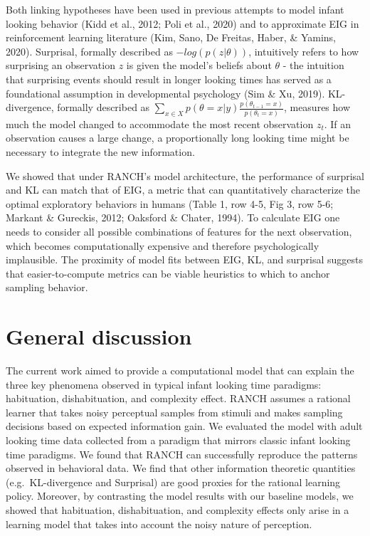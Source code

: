 \documentclass[10pt, letterpaper]{article}
\begin{document}
Both linking hypotheses have been used in previous attempts to model
infant looking behavior (Kidd et al., 2012; Poli et al., 2020) and to
approximate EIG in reinforcement learning literature (Kim, Sano, De
Freitas, Haber, \& Yamins, 2020). Surprisal, formally described as
\(-log(p(z|\theta))\), intuitively refers to how surprising an
observation \(z\) is given the model's beliefs about \(\theta\) - the
intuition that surprising events should result in longer looking times
has served as a foundational assumption in developmental psychology (Sim
\& Xu, 2019). KL-divergence, formally described as
\(\sum_{x \in X}{p(\theta = x|y)\frac{p(\theta_{t-1} = x)}{p(\theta_t = x)}}\),
measures how much the model changed to accommodate the most recent
observation \(z_t\). If an observation causes a large change, a
proportionally long looking time might be necessary to integrate the new
information.

We showed that under RANCH's model architecture, the performance of
surprisal and KL can match that of EIG, a metric that can quantitatively
characterize the optimal exploratory behaviors in humans (Table 1, row
4-5, Fig 3, row 5-6; Markant \& Gureckis, 2012; Oaksford \& Chater,
1994). To calculate EIG one needs to consider all possible combinations
of features for the next observation, which becomes computationally
expensive and therefore psychologically implausible. The proximity of
model fits between EIG, KL, and surprisal suggests that
easier-to-compute metrics can be viable heuristics to which to anchor
sampling behavior.

\hypertarget{general-discussion}{%
\section{General discussion}\label{general-discussion}}

The current work aimed to provide a computational model that can explain
the three key phenomena observed in typical infant looking time
paradigms: habituation, dishabituation, and complexity effect. RANCH
assumes a rational learner that takes noisy perceptual samples from
stimuli and makes sampling decisions based on expected information gain.
We evaluated the model with adult looking time data collected from a
paradigm that mirrors classic infant looking time paradigms. We found
that RANCH can successfully reproduce the patterns observed in
behavioral data. We find that other information theoretic quantities
(e.g.~KL-divergence and Surprisal) are good proxies for the rational
learning policy. Moreover, by contrasting the model results with our
baseline models, we showed that habituation, dishabituation, and
complexity effects only arise in a learning model that takes into
account the noisy nature of perception.
\end{document}

